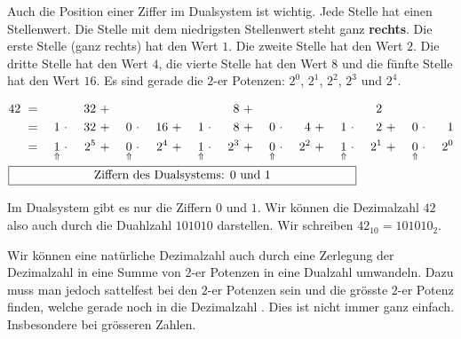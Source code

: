 Auch die Position einer Ziffer im Dualsystem ist wichtig. Jede Stelle hat einen Stellenwert. Die Stelle mit dem niedrigsten Stellenwert steht ganz \textbf{rechts}. Die erste Stelle (ganz rechts) hat den Wert $1$. Die zweite Stelle hat den Wert $2$. Die dritte Stelle hat den Wert $4$, die vierte Stelle hat den Wert $8$ und die fünfte Stelle hat den Wert $16$. Es sind gerade die $2$-er Potenzen: $2^0$, $2^1$, $2^2$, $2^3$ und $2^4$.

\begin{example}

\begin{alignat*}{16}
42 & ~ = ~ & & & 32 & ~ + ~ & & & & & & & 8 & ~ + ~ & & & & & & & 2 &\\
& ~ = ~ & 1 & ~\cdot~ & 32 & ~ + ~ & 0 & ~\cdot~ & 16 & ~ + ~ & 1 & ~\cdot~ & 8 & ~ + ~ & 0 & ~\cdot~ & 4 & ~ + ~ & 1 & ~\cdot~ & 2 & ~ + ~ & 0 & ~\cdot~ & 1 \\
& ~ = ~ & \underset{\Uparrow}{1} & ~\cdot~ & 2^5  & ~ + ~ & \underset{\Uparrow}{0} & ~\cdot~ & 2^4  & ~ + ~ & \underset{\Uparrow}{1} & ~\cdot~ & 2^3 & ~ + ~ & \underset{\Uparrow}{0} & ~\cdot~ & 2^2 & ~ + ~ & \underset{\Uparrow}{1} & ~\cdot~ & 2^1 & ~ + ~ & \underset{\Uparrow}{0} & ~\cdot~ & 2^0 \\
\omit\rlap{\framebox[10cm]{Ziffern des Dualsystems: $0$ und $1$}}
\end{alignat*}

Im Dualsystem gibt es nur die Ziffern $0$ und $1$. Wir können die Dezimalzahl $42$ also auch durch die Duahlzahl $101010$ darstellen. Wir schreiben $42_{10} = 101010_2$.

\end{example}

Wir können eine natürliche Dezimalzahl auch durch eine Zerlegung der Dezimalzahl in eine Summe von $2$-er Potenzen in eine Dualzahl umwandeln. Dazu muss man jedoch sattelfest bei den $2$-er Potenzen sein und die grösste $2$-er Potenz finden, welche gerade noch in die Dezimalzahl . Dies ist nicht immer ganz einfach. Insbesondere bei grösseren Zahlen.

